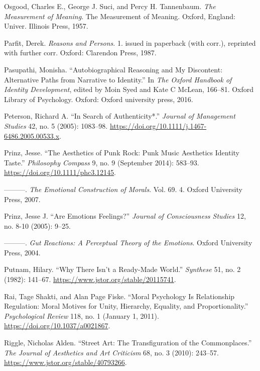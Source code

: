 \documentclass[
  12pt,
]{book}
\newlength{\cslhangindent}
\newenvironment{CSLReferences}[2] %
 {\begin{list}{}{%
  \setlength{\itemindent}{0pt}
  \setlength{\leftmargin}{0pt}
  \setlength{\parsep}{0pt}
  \ifodd #1
   \setlength{\leftmargin}{\cslhangindent}
   \setlength{\itemindent}{-1\cslhangindent}
  \fi
  \setlength{\itemsep}{#2\baselineskip}}}
 {\end{list}}
\theoremstyle{definition}
\theoremstyle{definition}
\theoremstyle{definition}
\theoremstyle{definition}
\theoremstyle{remark}
\begin{document}
\begin{CSLReferences}{1}{0}
Osgood, Charles E., George J. Suci, and Percy H. Tannenbaum. \emph{The Measurement of Meaning}. The Measurement of Meaning. Oxford, England: Univer. Illinois Press, 1957.

Parfit, Derek. \emph{Reasons and Persons}. 1. issued in paperback (with corr.), reprinted with further corr. Oxford: Clarendon Press, 1987.

Pasupathi, Monisha. {``Autobiographical {Reasoning} and {My} {Discontent}: {Alternative Paths} from {Narrative} to {Identity}.''} In \emph{The {Oxford} Handbook of Identity Development}, edited by Moin Syed and Kate C McLean, 166--81. Oxford Library of Psychology. Oxford: Oxford university press, 2016.

Peterson, Richard A. {``In {Search} of {Authenticity}*.''} \emph{Journal of Management Studies} 42, no. 5 (2005): 1083--98. \url{https://doi.org/10.1111/j.1467-6486.2005.00533.x}.

Prinz, Jesse. {``The {Aesthetics} of {Punk Rock}: {Punk Music Aesthetics Identity Taste}.''} \emph{Philosophy Compass} 9, no. 9 (September 2014): 583--93. \url{https://doi.org/10.1111/phc3.12145}.

---------. \emph{The {Emotional Construction} of {Morals}}. Vol. 69. 4. Oxford University Press, 2007.

Prinz, Jesse J. {``Are Emotions Feelings?''} \emph{Journal of Consciousness Studies} 12, no. 8-10 (2005): 9--25.

---------. \emph{Gut {Reactions}: {A Perceptual Theory} of the {Emotions}}. Oxford University Press, 2004.

Putnam, Hilary. {``Why {There Isn}'t a {Ready-Made World}.''} \emph{Synthese} 51, no. 2 (1982): 141--67. \url{https://www.jstor.org/stable/20115741}.

Rai, Tage Shakti, and Alan Page Fiske. {``Moral Psychology Is Relationship Regulation: Moral Motives for Unity, Hierarchy, Equality, and Proportionality.''} \emph{Psychological Review} 118, no. 1 (January 1, 2011). \url{https://doi.org/10.1037/a0021867}.

Riggle, Nicholas Alden. {``Street {Art}: {The Transfiguration} of the {Commonplaces}.''} \emph{The Journal of Aesthetics and Art Criticism} 68, no. 3 (2010): 243--57. \url{https://www.jstor.org/stable/40793266}.


\end{CSLReferences}
\end{document}
